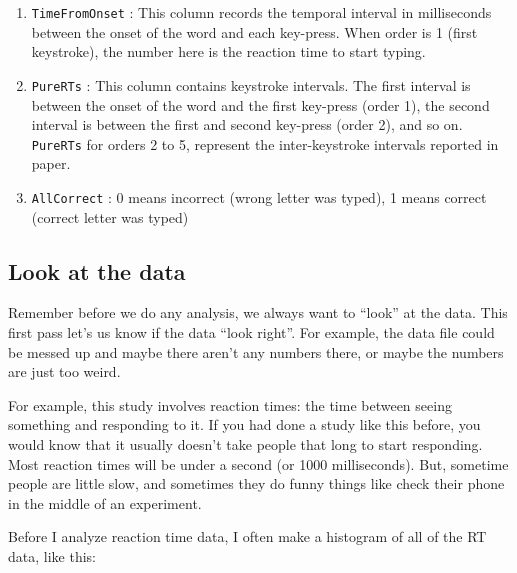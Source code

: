 \documentclass[
]{book}
\newenvironment{Shaded}{\begin{snugshade}}{\end{snugshade}}
\newcommand{\FunctionTok}[1]{\textcolor[rgb]{0.13,0.29,0.53}{\textbf{#1}}}
\newcommand{\NormalTok}[1]{#1}
\newcommand{\SpecialCharTok}[1]{\textcolor[rgb]{0.81,0.36,0.00}{\textbf{#1}}}
\providecommand{\tightlist}{%
  \setlength{\itemsep}{0pt}\setlength{\parskip}{0pt}}
\begin{document}
\begin{enumerate}
\def\labelenumi{\arabic{enumi}.}
\tightlist
\item
  \texttt{TimeFromOnset} : This column records the temporal interval in milliseconds between the onset of the word and each key-press. When order is 1 (first keystroke), the number here is the reaction time to start typing.
\item
  \texttt{PureRTs} : This column contains keystroke intervals. The first interval is between the onset of the word and the first key-press (order 1), the second interval is between the first and second key-press (order 2), and so on. \texttt{PureRTs} for orders 2 to 5, represent the inter-keystroke intervals reported in paper.
\item
  \texttt{AllCorrect} : 0 means incorrect (wrong letter was typed), 1 means correct (correct letter was typed)
\end{enumerate}

\hypertarget{look-at-the-data-3}{%
\subsection{Look at the data}\label{look-at-the-data-3}}

Remember before we do any analysis, we always want to ``look'' at the data. This first pass let's us know if the data ``look right''. For example, the data file could be messed up and maybe there aren't any numbers there, or maybe the numbers are just too weird.

For example, this study involves reaction times: the time between seeing something and responding to it. If you had done a study like this before, you would know that it usually doesn't take people that long to start responding. Most reaction times will be under a second (or 1000 milliseconds). But, sometime people are little slow, and sometimes they do funny things like check their phone in the middle of an experiment.

Before I analyze reaction time data, I often make a histogram of all of the RT data, like this:

\begin{Shaded}
\end{Shaded}
\end{document}
